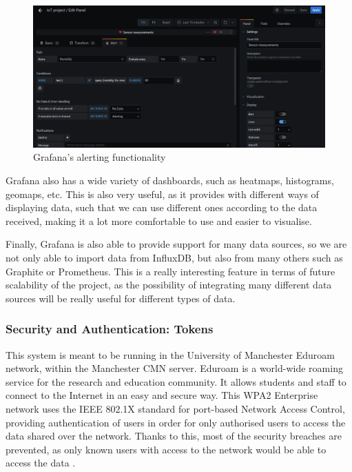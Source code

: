 \documentclass[12pt]{article}
\begin{document}
\begin{figure}[h]
\includegraphics[scale=0.3]{grafana-alerting}
\centering
\caption{Grafana's alerting functionality}
\label{fig:grafana-alerting}
\end{figure}

Grafana also has a wide variety of dashboards, such as heatmaps, histograms, geomaps, etc. This is also very useful, as it provides with different ways of displaying data, such that we can use different ones according to the data received, making it a lot more comfortable to use and easier to visualise.\par

Finally, Grafana is also able to provide support for many data sources, so we are not only able to import data from InfluxDB, but also from many others such as Graphite or Prometheus. This is a really interesting feature in terms of future scalability of the project, as the possibility of integrating many different data sources will be really useful for different types of data.

\subsubsection{Security and Authentication: Tokens}

This system is meant to be running in the University of Manchester Eduroam network, within the Manchester CMN server. Eduroam is a world-wide roaming service for the research and education community. It allows students and staff to connect to the Internet in an easy and secure way. This WPA2 Enterprise network uses the IEEE 802.1X standard for port-based Network Access Control, providing authentication of users in order for only authorised users to access the data shared over the network. Thanks to this, most of the security breaches are prevented, as only known users with access to the network would be able to access the data \cite{eduroam}. \par 
\end{document}
